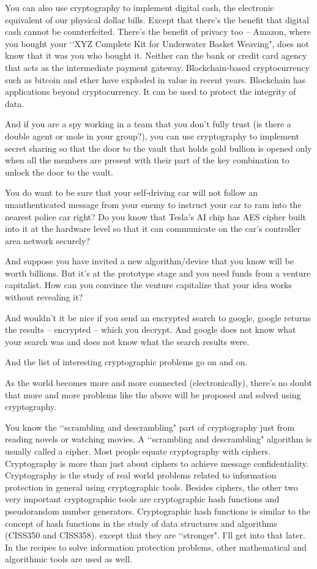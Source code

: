 You can also use cryptography to implement digital cash,
the electronic equivalent of our physical dollar bills.
Except that there's the benefit that digital cash cannot be counterfeited.
There's the benefit of privacy too -- Amazon, where
you bought your
\lq\lq XYZ Complete Kit for Underwater Basket Weaving", does not
know that it was you who bought it.
Neither can the bank or credit card agency that acts as the
intermediate payment gateway.
Blockchain-based cryptocurrency such as bitcoin and ether
have exploded in value in recent years.
Blockchain has applications beyond cryptocurrency.
It can be used to protect the integrity of data.

And if you are a spy working in a team that you don't fully trust (is there
a double agent or mole in your group?),
you can use cryptography to implement secret sharing so that
the door to the vault
that holds gold bullion is opened only when all the members are
present with their part of the key combination to unlock the door to the vault.

You do want to be sure that
your self-driving car will not follow an unauthenticated
message from your enemy to instruct your car to ram into the
nearest police car right?
Do you know that Tesla's AI chip has AES cipher built into it at the
hardware level so that it can communicate on the
car's controller area network securely?

And suppose you have invited a new algorithm/device that you know will be
worth billions.
But it's at the prototype stage and you need funds from
a venture capitalist.
How can you convince the venture capitalize that your idea
works without revealing it?
 
And wouldn't it be nice if you send an encrypted search to google,
google returns the results -- encrypted -- which you decrypt.
And google does not know what your search was and does not know what
the search results were.

And the list of interesting cryptographic problems go on and on.

As the world becomes more and more connected (electronically),
there's no doubt that more and more problems like the above will be
proposed and solved using cryptography.

You know the \lq\lq scrambling and descrambling" part of cryptography
just from reading novels or watching movies.
A \lq\lq scrambling and descrambling" algorithm is usually called a
cipher.
Most people equate cryptography with ciphers.
Cryptography is more than just about ciphers 
to achieve message confidentiality.
Cryptography is the study of real world problems
related to information protection in general using cryptographic tools.
Besides ciphers, the other two very important cryptographic tools
are cryptographic hash functions and
pseudorandom number generators.
Cryptographic hash functions is similar to the concept of hash functions in
the study of data structures and algorithms (CISS350 and CISS358).
except that
they are \lq\lq stronger".
I'll get into that later.
In the recipes to solve information protection problems,
other mathematical and algorithmic tools are used as well.

